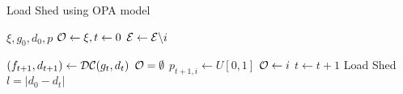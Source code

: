 \begin{algorithm}\label{opa_alg}
\caption{Load Shed using OPA model}
\begin{algorithmic} 

\REQUIRE $\xi, g_0, d_0, p$
\STATE $\mathcal{O} \leftarrow \xi, t \leftarrow 0$
\WHILE{$\cO \neq \emptyset$} 
		\STATE $\mathcal{E} \leftarrow \mathcal{E} \backslash i$ 
	\ENDFOR

	\STATE $ ( f_{t+1}, d_{t+1} ) \leftarrow \mathcal{DC}( g_t, d_t ) $
	\STATE $\mathcal{O} = \emptyset$
			\STATE $p_{t+1,i} \leftarrow U[0,1]$  		%
				\STATE $\mathcal{O} \leftarrow i$
			\ENDIF
		\ENDIF
	\ENDFOR
	\STATE $t \leftarrow t+1$
\ENDWHILE
\STATE Load Shed $ l = \left| d_0 - d_t \right|$

\end{algorithmic}
\end{algorithm}
